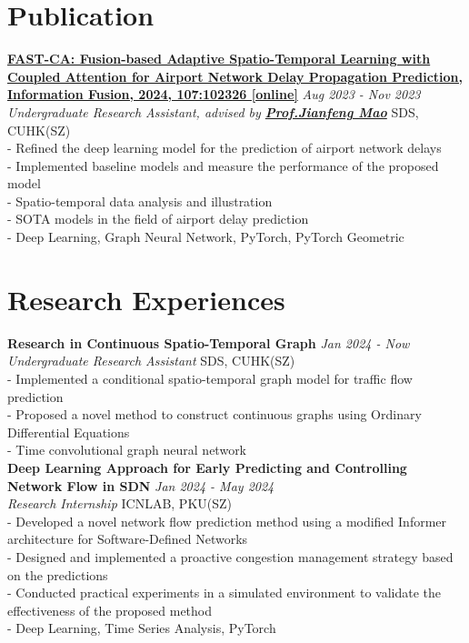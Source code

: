 \documentclass[a4paper,10pt]{article}
\begin{document}
\section*{Publication}
\href{https://www.sciencedirect.com/science/article/pii/S1566253524001040}{\textbf{FAST-CA: Fusion-based Adaptive Spatio-Temporal Learning with Coupled Attention for Airport Network Delay Propagation Prediction, Information Fusion, 2024, 107:102326 [online]}} \hfill \textit{Aug 2023 - Nov 2023}\\
\textit{Undergraduate Research Assistant, advised by \textbf{\href{https://sds.cuhk.edu.cn/en/teacher/268}{Prof.\@ Jianfeng Mao}}} \hfill SDS, CUHK(SZ)\\
- Refined the deep learning model for the prediction of airport network delays\\
- Implemented baseline models and measure the performance of the proposed model\\
- Spatio-temporal data analysis and illustration\\
- SOTA models in the field of airport delay prediction\\
- Deep Learning, Graph Neural Network, PyTorch, PyTorch Geometric
\section*{Research Experiences}
\textbf{Research in Continuous Spatio-Temporal Graph} \hfill \textit{Jan 2024 - Now}\\
\textit{Undergraduate Research Assistant} \hfill SDS, CUHK(SZ)\\
- Implemented a conditional spatio-temporal graph model for traffic flow prediction\\
- Proposed a novel method to construct continuous graphs using Ordinary Differential Equations\\
- Time convolutional graph neural network\\
\textbf{Deep Learning Approach for Early Predicting and Controlling Network Flow in SDN} \hfill \textit{Jan 2024 - May 2024}\\
\textit{Research Internship} \hfill ICNLAB, PKU(SZ)\\
- Developed a novel network flow prediction method using a modified Informer architecture for Software-Defined Networks\\
- Designed and implemented a proactive congestion management strategy based on the predictions\\
- Conducted practical experiments in a simulated environment to validate the effectiveness of the proposed method\\
- Deep Learning, Time Series Analysis, PyTorch
\end{document}
